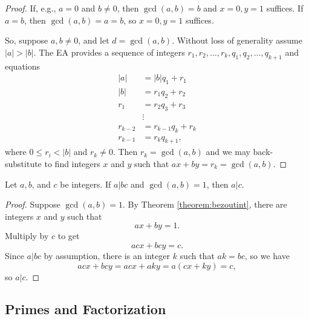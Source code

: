 \documentclass[english,course]{lecture}
\renewcommand{\le}{\leqslant}
\renewcommand{\ge}{\geqslant}
\newenvironment{facnote}{\startfacnote}{}
\def\startfacnote#1\end{\margintext{{\sc Note:} #1}\end}
\theoremstyle{plain}
\def\setof#1#2{{\left\{#1\,\colon\,#2\right\}}}
\def\Z{{\mathbb Z}}
\def\presnotes{}
\begin{document}
\begin{proof}
	If, e.g., $a = 0$ and $b\ne 0$, then $\gcd(a,b) = b$ and $x=0,y=1$ suffices.
	If $a = b$, then $\gcd(a,b) = a = b$, so $x = 0, y = 1$ suffices.
	
	So, suppose $a,b\ne 0$, and let $d = \gcd(a,b)$.
	Without loss of generality assume $|a| > |b|$.
	The EA provides a sequence of integers $r_1, r_2, \ldots, r_k, q_1, q_2, \ldots, q_{k+1}$ and equations 
	\begin{align*}
		|a| &= |b| q_1 + r_1 \\
		|b| &= r_1 q_2 + r_2 \\
		r_1 &= r_2 q_3 + r_3 \\
		&\vdots\\
		r_{k-2} &= r_{k-1} q_k + r_k\\
		r_{k-1} &= r_k q_{k+1},
	\end{align*}
	where $0\le r_i < |b|$ and $r_k \ne 0$.
	Then $r_k = \gcd(a,b)$ and we may back-substitute to find integers $x$ and $y$ such that $ax + by = r_k = \gcd(a,b)$.
\end{proof}

\presnotes

\begin{theorem}\label{theorem:relprimecancel}
	Let $a, b$, and $c$ be integers.
	If $a|bc$ and $\gcd(a,b) = 1$, then $a|c$.
\end{theorem}

\begin{proof}
	Suppose $\gcd(a,b) = 1$.
	By Theorem \ref{theorem:bezoutint}, there are integers $x$ and $y$ such that
	\[
		ax+by = 1.
	\]
	Multiply by $c$ to get
	\[
		acx + bcy = c.
	\]
	Since $a|bc$ by assumption, there is an integer $k$ such that $ak = bc$, so we have
	\[
		acx + bcy = acx + aky = a(cx+ky) = c,
	\]
	so $a|c$.
\end{proof}

\presnotes


\subsection{Primes and Factorization}\label{SubSec-Primes-and-Factorization}
\end{document}
